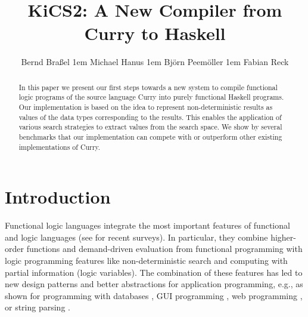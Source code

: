 \documentclass{llncs}
\begin{document}
\sloppy

\title{KiCS2: A New Compiler from Curry to Haskell}

\author{
Bernd Bra{\ss}el
\kern1em
Michael Hanus
\kern1em
Bj{\"o}rn Peem{\"o}ller
\kern1em
Fabian Reck
}

\maketitle

\begin{abstract}
In this paper we present our first steps towards a new system
to compile functional logic programs of the source language Curry
into purely functional Haskell programs.
Our implementation is based on the idea to represent
non-deterministic results as values of the data types corresponding
to the results.
This enables the application of various search strategies
to extract values from the search space.
We show by several benchmarks that our implementation
can compete with or outperform other existing implementations of Curry.
\end{abstract}


\section{Introduction}
\label{sec:Introduction}

Functional logic languages integrate the most important
features of functional and logic languages
(see \cite{AntoyHanus10CACM,Hanus07ICLP} for recent surveys).
In particular, they combine higher-order functions and demand-driven
evaluation from functional programming with logic programming features
like non-deterministic search and computing with partial information
(logic variables).
The combination of these features
has led to new design patterns \cite{AntoyHanus02FLOPS}
and better abstractions for application programming,
e.g., as shown for programming with databases
\cite{BrasselHanusMueller08PADL,Fischer05},
GUI programming \cite{Hanus00PADL},
web programming \cite{Hanus01PADL,Hanus06PPDP,HanusKoschnicke10PADL},
or string parsing \cite{CaballeroLopez99}.
\end{document}
